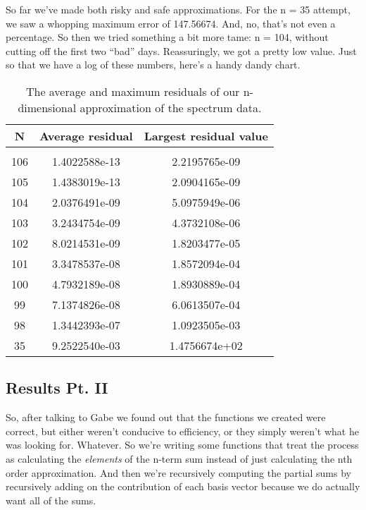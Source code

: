 \documentclass{article}
\begin{document}
So far we've made both risky and safe approximations.  For the n = 35
attempt, we saw a whopping maximum error of 147.56674.  And, no, that's not
even a percentage.  So then we tried something a bit more tame: n =
104, without cutting off the first two ``bad'' days.  Reassuringly, we
got a pretty low value.  Just so that we have a log of these numbers,
here's a handy dandy chart.
\begin{table}[r]
  \centering
  \begin{tabular}[c]{c||cc}
    \hline\hline
    N & Average residual & Largest residual value \\
    \hline \\
    106 & 1.4022588e-13 & 2.2195765e-09 \\
    105 & 1.4383019e-13 & 2.0904165e-09 \\
    104 & 2.0376491e-09 & 5.0975949e-06 \\
    103 & 3.2434754e-09 & 4.3732108e-06 \\
    102 & 8.0214531e-09 & 1.8203477e-05 \\
    101 & 3.3478537e-08 & 1.8572094e-04 \\
    100 & 4.7932189e-08 & 1.8930889e-04 \\
    99 & 7.1374826e-08 & 6.0613507e-04 \\
    98 & 1.3442393e-07 & 1.0923505e-03 \\
    35 & 9.2522540e-03 & 1.4756674e+02 \\
    \hline\hline
  \end{tabular}
  \caption{The average and maximum residuals of our n-dimensional
    approximation of the spectrum data.}
\label{tab:residuals}
\end{table}

\subsection{Results Pt. II}
\label{sec:results2}
So, after talking to Gabe we found out that the functions we created
were correct, but either weren't conducive to efficiency, or they
simply weren't what he was looking for.  Whatever.  So we're writing
some functions that treat the process as calculating the
\emph{elements} of the n-term sum instead of just calculating the nth
order approximation.  And then we're recursively computing the partial
sums by recursively adding on the contribution of each basis vector
because we do actually want all of the sums.
\end{document}
